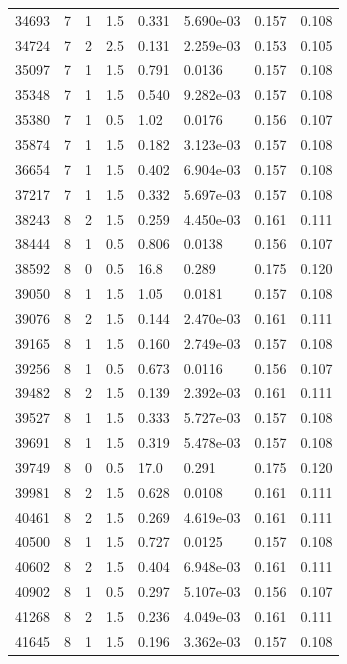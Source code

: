 \documentclass[preview]{standalone}
\begin{document}
{{{\begin{tabular}{L{1.2cm}C{1.2cm} C{0.3cm}C{0.5cm} C{1.4cm}C{1.4cm} C{1.4cm}C{1.4cm}}
  34693  &     7  & 1     & 1.5 &  0.331  & 5.690e-03  & 0.157 &  0.108   \\ 
  34724  &     7  & 2     & 2.5 &  0.131  & 2.259e-03  & 0.153 &  0.105   \\ 
  35097  &     7  & 1     & 1.5 &  0.791  & 0.0136  & 0.157 &  0.108   \\ 
  35348  &     7  & 1     & 1.5 &  0.540  & 9.282e-03  & 0.157 &  0.108   \\ 
  35380  &     7  & 1     & 0.5 &  1.02  & 0.0176  & 0.156 &  0.107   \\ 
  35874  &     7  & 1     & 1.5 &  0.182  & 3.123e-03  & 0.157 &  0.108   \\ 
  36654  &     7  & 1     & 1.5 &  0.402  & 6.904e-03  & 0.157 &  0.108   \\ 
  37217  &     7  & 1     & 1.5 &  0.332  & 5.697e-03  & 0.157 &  0.108   \\ 
  38243  &     8  & 2     & 1.5 &  0.259  & 4.450e-03  & 0.161 &  0.111   \\ 
  38444  &     8  & 1     & 0.5 &  0.806  & 0.0138  & 0.156 &  0.107   \\ 
  38592  &     8  & 0     & 0.5 &  16.8  & 0.289  & 0.175 &  0.120   \\ 
  39050  &     8  & 1     & 1.5 &  1.05  & 0.0181  & 0.157 &  0.108   \\ 
  39076  &     8  & 2     & 1.5 &  0.144  & 2.470e-03  & 0.161 &  0.111   \\ 
  39165  &     8  & 1     & 1.5 &  0.160  & 2.749e-03  & 0.157 &  0.108   \\ 
  39256  &     8  & 1     & 0.5 &  0.673  & 0.0116  & 0.156 &  0.107   \\ 
  39482  &     8  & 2     & 1.5 &  0.139  & 2.392e-03  & 0.161 &  0.111   \\ 
  39527  &     8  & 1     & 1.5 &  0.333  & 5.727e-03  & 0.157 &  0.108   \\ 
  39691  &     8  & 1     & 1.5 &  0.319  & 5.478e-03  & 0.157 &  0.108   \\ 
  39749  &     8  & 0     & 0.5 &  17.0  & 0.291  & 0.175 &  0.120   \\ 
  39981  &     8  & 2     & 1.5 &  0.628  & 0.0108  & 0.161 &  0.111   \\ 
  40461  &     8  & 2     & 1.5 &  0.269  & 4.619e-03  & 0.161 &  0.111   \\ 
  40500  &     8  & 1     & 1.5 &  0.727  & 0.0125  & 0.157 &  0.108   \\ 
  40602  &     8  & 2     & 1.5 &  0.404  & 6.948e-03  & 0.161 &  0.111   \\ 
  40902  &     8  & 1     & 0.5 &  0.297  & 5.107e-03  & 0.156 &  0.107   \\ 
  41268  &     8  & 2     & 1.5 &  0.236  & 4.049e-03  & 0.161 &  0.111   \\ 
  41645  &     8  & 1     & 1.5 &  0.196  & 3.362e-03  & 0.157 &  0.108   \\ 
\hline 
\end{tabular} 

}}}
\end{document}
